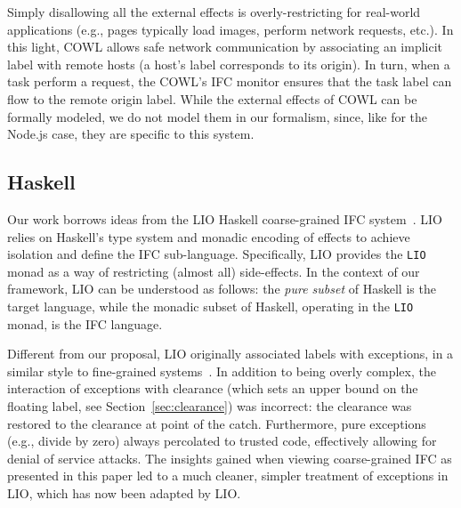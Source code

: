 Simply disallowing all the external effects is overly-restricting for
real-world applications (e.g., pages typically load images, perform
network requests, etc.).
%
In this light, COWL allows safe network communication by associating an
implicit label with remote hosts (a host's label corresponds to
its origin).
%
In turn, when a task perform a request, the COWL's IFC monitor
ensures that the task label can flow to the remote origin label.
%
While the external effects of COWL can be formally modeled, we do not
model them in our formalism, %
since, like for the
Node.js case, they are specific to this system.
%



\subsection{Haskell}
\label{sec:real:hs}
Our work borrows ideas from the LIO Haskell coarse-grained IFC
system~\cite{lio, stefan:addressing-covert}.
%
LIO relies on Haskell's type system and monadic encoding of
effects to achieve isolation and define the IFC sub-language.
%
Specifically, LIO provides the \verb|LIO| monad as a way of restricting
(almost all) side-effects.
%
In the context of our framework, LIO can be understood as follows: the
\emph{pure subset} of Haskell is the target language, while the
monadic subset of Haskell, operating in the \verb|LIO| monad, is the
IFC language.

%
Different from our proposal, LIO originally associated labels with exceptions, in a
similar style to fine-grained
systems~\cite{stefan:2012:arxiv-flexible, Hritcu:2013:YIB:2497621.2498098}.
%
In addition to being overly complex, the interaction of exceptions
with clearance (which sets an upper bound on the floating label, see
Section~\ref{sec:clearance}) was incorrect: the clearance
was restored to the clearance at point of the catch.
%
Furthermore, pure exceptions (e.g., divide by zero) always percolated to
trusted code, effectively allowing for denial of service attacks.
%
The insights gained when viewing coarse-grained IFC as presented in this
paper led to a much cleaner, simpler treatment of exceptions in LIO,
which has now been adapted by LIO.






